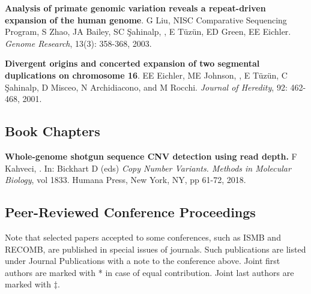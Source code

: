 \vspace{-.2cm}
  {\bf Analysis of primate genomic variation reveals a repeat-driven 
    expansion of the human genome}.
  G Liu, NISC Comparative Sequencing Program, S Zhao, JA Bailey, 
  SC \c{S}ahinalp, \calkan{}, E T\"{u}z\"{u}n, ED Green, EE Eichler.
  {\em Genome Research}, 13(3): 358-368, 2003.

\vspace{-.2cm}
  {\bf Divergent origins and concerted expansion of two segmental
    duplications on 
    chromosome 16}.
  EE Eichler, ME Johnson, \calkan{}, E T\"{u}z\"{u}n, C \c{S}ahinalp,
    D Misceo, 
    N Archidiacono, and M Rocchi.
    {\em Journal of Heredity}, 92: 462-468, 2001.


\clearpage

\vspace{-.4cm}
\subsection{\small \sc  Book Chapters}
\vspace{-.4cm}


       {\bf Whole-genome shotgun sequence CNV detection using read depth.}
       F Kahveci, \calkan{}.
       In: Bickhart D (eds) {\em Copy Number Variants. Methods in Molecular Biology}, vol 1833. Humana Press, New York, NY, pp 61-72, 2018.



\vspace{-.4cm}
\subsection{\small \sc  Peer-Reviewed Conference Proceedings}
\vspace{-.4cm}
       {\small
Note that selected papers accepted to some conferences, such as ISMB and RECOMB, are published
in special issues of journals. Such publications are listed under Journal Publications with a note to the conference above.
Joint first authors are marked with * in case of equal contribution.
Joint last authors are marked with $\ddag$.
}




